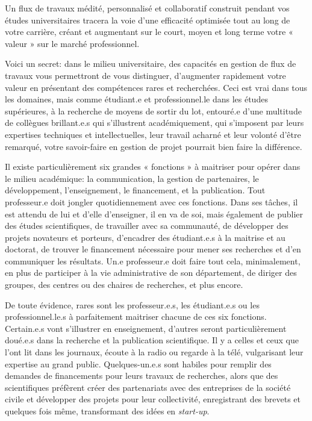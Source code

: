 \documentclass[
  letterpaper,
  DIV=11,
  numbers=noendperiod]{scrreprt}
\begin{document}
Un flux de travaux médité, personnalisé et collaboratif construit
pendant vos études universitaires tracera la voie d'une efficacité
optimisée tout au long de votre carrière, créant et augmentant sur le
court, moyen et long terme votre « valeur » sur le marché professionnel.

Voici un secret: dans le milieu universitaire, des capacités en gestion
de flux de travaux vous permettront de vous distinguer, d'augmenter
rapidement votre valeur en présentant des compétences rares et
recherchées. Ceci est vrai dans tous les domaines, mais comme étudiant.e
et professionnel.le dans les études supérieures, à la recherche de
moyens de sortir du lot, entouré.e d'une multitude de collègues
brillant.e.s qui s'illustrent académiquement, qui s'imposent par leurs
expertises techniques et intellectuelles, leur travail acharné et leur
volonté d'être remarqué, votre savoir-faire en gestion de projet
pourrait bien faire la différence.

Il existe particulièrement six grandes « fonctions » à maitriser pour
opérer dans le milieu académique: la communication, la gestion de
partenaires, le développement, l'enseignement, le financement, et la
publication. Tout professeur.e doit jongler quotidiennement avec ces
fonctions. Dans ses tâches, il est attendu de lui et d'elle d'enseigner,
il en va de soi, mais également de publier des études scientifiques, de
travailler avec sa communauté, de développer des projets novateurs et
porteurs, d'encadrer des étudiant.e.s à la maitrise et au doctorat, de
trouver le financement nécessaire pour mener ses recherches et d'en
communiquer les résultats. Un.e professeur.e doit faire tout cela,
minimalement, en plus de participer à la vie administrative de son
département, de diriger des groupes, des centres ou des chaires de
recherches, et plus encore.

De toute évidence, rares sont les professeur.e.s, les étudiant.e.s ou
les professionnel.le.s à parfaitement maitriser chacune de ces six
fonctions. Certain.e.s vont s'illustrer en enseignement, d'autres seront
particulièrement doué.e.s dans la recherche et la publication
scientifique. Il y a celles et ceux que l'ont lit dans les journaux,
écoute à la radio ou regarde à la télé, vulgarisant leur expertise au
grand public. Quelques-un.e.s sont habiles pour remplir des demandes de
financements pour leurs travaux de recherches, alors que des
scientifiques préfèrent créer des partenariats avec des entreprises de
la société civile et développer des projets pour leur collectivité,
enregistrant des brevets et quelques fois même, transformant des idées
en \emph{start-up}.
\end{document}
